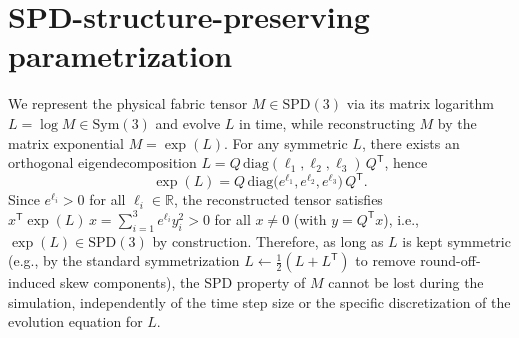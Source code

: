 \section{SPD-structure-preserving parametrization}
\label{sec:structure-preserving}
We represent the physical fabric tensor $M\in\mathrm{SPD}(3)$ via its matrix logarithm $L=\log M\in\mathrm{Sym}(3)$ and evolve $L$ in time, while reconstructing $M$ by the
matrix exponential $M=\exp(L)$. For any symmetric $L$, there exists an orthogonal eigendecomposition $L=Q\,\mathrm{diag}(\ell_1,\ell_2,\ell_3)\,Q^{\mathsf T}$, hence
\[
\exp(L)=Q\,\mathrm{diag}\!\big(e^{\ell_1},e^{\ell_2},e^{\ell_3}\big)\,Q^{\mathsf T}.
\]
Since $e^{\ell_i}>0$ for all $\ell_i\in\mathbb{R}$, the reconstructed tensor satisfies $x^{\mathsf T}\exp(L)\,x=\sum_{i=1}^3 e^{\ell_i} y_i^2>0$ for all $x\neq 0$ (with $y=Q^{\mathsf T}x$), i.e., $\exp(L)\in\mathrm{SPD}(3)$ by construction. Therefore, as long as $L$ is kept symmetric (e.g., by the standard symmetrization $L\leftarrow \tfrac12(L+L^{\mathsf T})$ to remove round-off-induced skew components), the SPD property of $M$ cannot be lost during the simulation, independently of the time step size or the specific discretization of the evolution equation for $L$.
